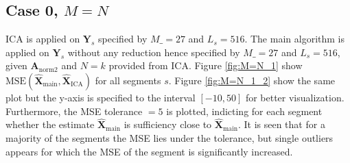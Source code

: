 \subsection{Case 0, $M = N$}
ICA is applied on $\mathbf{Y}_s$ specified by $M\_ = 27$ and $L_s = 516$. 
The main algorithm is applied on $\mathbf{Y}_s$ without any reduction hence specified by $M\_ = 27$ and $L_s = 516$, given $\mathbf{A}_{\text{norm2}}$ and $N = k$ provided from ICA.
Figure \ref{fig:M=N_1} show $\text{MSE}\left(\hat{\mathbf{X}}_{\text{main}},\hat{\mathbf{X}}_{\text{ICA}}\right)$ for all segments $s$. 
Figure \ref{fig:M=N_1_2} show the same plot but the y-axis is specified to the interval $[-10,50]$ for better visualization.
Furthermore, the MSE tolerance $= 5$ is plotted, indicting for each segment whether the estimate $\hat{\mathbf{X}}_{\text{main}}$ is sufficiency close to $\hat{\mathbf{X}}_{\text{main}}$. 
It is seen that for a majority of the segments the MSE lies under the tolerance, but single outliers appears for which the MSE of the segment is significantly increased.    
